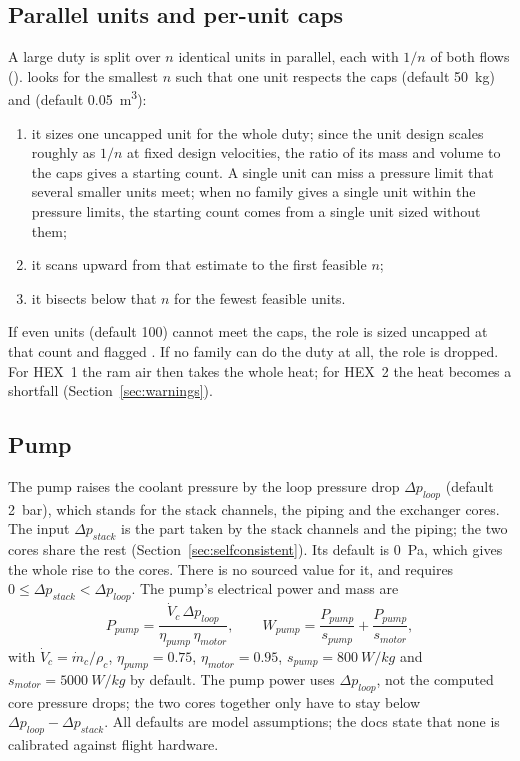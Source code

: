 \documentclass[a4paper,11pt]{article}
\begin{document}
\subsection{Parallel units and per-unit caps}\label{sec:parallel}
A large duty is split over $n$ identical units in parallel, each with $1/n$ of both flows
().  looks for the smallest $n$ such that one
unit respects the caps  (default \SI{50}{kg}) and
 (default \SI{0.05}{m^3}):
\begin{enumerate}
\item it sizes one uncapped unit for the whole duty; since the unit design scales roughly
  as $1/n$ at fixed design velocities, the ratio of its mass and volume to the caps gives a
  starting count. A single unit can miss a pressure limit that several smaller units meet;
  when no family gives a single unit within the pressure limits, the starting count comes
  from a single unit sized without them;
\item it scans upward from that estimate to the first feasible $n$;
\item it bisects below that $n$ for the fewest feasible units.
\end{enumerate}
If even  units (default 100) cannot meet the caps, the role is sized
uncapped at that count and flagged . If no family can do the duty at
all, the role is dropped. For HEX~1 the ram air then takes the whole heat; for HEX~2 the
heat becomes a shortfall (Section~\ref{sec:warnings}).

\subsection{Pump}\label{sec:pump}
The pump raises the coolant pressure by the loop pressure drop $\Delta p_{loop}$ (default
\SI{2}{bar}), which stands for the stack channels, the piping and the exchanger cores. The
input  $\Delta p_{stack}$ is the part taken by the stack channels
and the piping; the two cores share the rest (Section~\ref{sec:selfconsistent}). Its default
is \SI{0}{Pa}, which gives the whole rise to the cores. There is no sourced value for it, and
 requires $0 \le \Delta p_{stack} < \Delta p_{loop}$. The pump's
electrical power and mass are
\begin{equation}
  P_{pump} = \frac{\dot V_c\,\Delta p_{loop}}{\eta_{pump}\,\eta_{motor}},\qquad
  W_{pump} = \frac{P_{pump}}{s_{pump}} + \frac{P_{pump}}{s_{motor}},
  \label{eq:pump}
\end{equation}
with $\dot V_c = \dot m_c/\rho_c$, $\eta_{pump} = 0.75$, $\eta_{motor} = 0.95$,
$s_{pump} = \SI{800}{W/kg}$ and $s_{motor} = \SI{5000}{W/kg}$ by default. The pump power
uses $\Delta p_{loop}$, not the computed core pressure drops; the two cores together only
have to stay below $\Delta p_{loop} - \Delta p_{stack}$. All defaults are model
assumptions; the docs state that none is calibrated against flight hardware.
\end{document}

